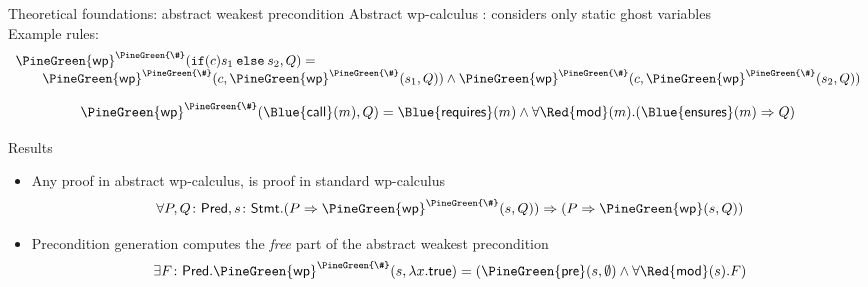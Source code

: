 \documentclass[final,nocolorBG,a4,marieke,nototal,pdf, accumulate,slideColor]{prosper}
\begin{document}
\begin{slide}{Theoretical foundations: abstract weakest precondition}
Abstract wp-calculus : considers only static 
ghost variables\\
Example rules:
\[
\begin{array}{l}
\mathsf{\PineGreen{wp}}^{\PineGreen{\#}}(\mathtt{if
(}c\mathtt{)}s_1\mathtt{\:else\:}s_2,Q) =\\
\qquad
\mathsf{\PineGreen{wp}}^{\PineGreen{\#}}(c, \mathsf{\PineGreen{wp}}^{\PineGreen{\#}}(s_1, Q)) \wedge
\mathsf{\PineGreen{wp}}^{\PineGreen{\#}}(c,
\mathsf{\PineGreen{wp}}^{\PineGreen{\#}}(s_2, Q))
\end{array}
\]

\[
\mathsf{\PineGreen{wp}}^{\PineGreen{\#}}(\mathsf{\Blue{call}}(m), Q) =
  \mathsf{\Blue{requires}}(m) \wedge 
  \forall \mathsf{\Red{mod}}(m). (\mathsf{\Blue{ensures}}(m) \Rightarrow Q)
\]
\end{slide}

\begin{slide}{Results}
\begin{itemize}
\item Any proof in abstract wp-calculus, is proof in standard
wp-calculus
\[
\forall P, Q\colon\mathsf{Pred}, s\colon\mathsf{Stmt}. 
(P \Rightarrow \mathsf{\PineGreen{wp}}^{\PineGreen{\#}}(s, Q)) \Rightarrow
               (P \Rightarrow \mathsf{\PineGreen{wp}}(s, Q))
\]
\item Precondition generation computes the \emph{free} part of the
abstract weakest precondition
\[
\exists F\colon\mathsf{Pred}.  
             \mathsf{\PineGreen{wp}}^{\PineGreen{\#}}(s, \lambda x. \mathsf{true}) = 
             (\mathsf{\PineGreen{pre}}(s, \emptyset) \wedge \forall
              \mathsf{\Red{mod}}(s). F) 
\]
\end{itemize}
\end{slide}
\end{document}
